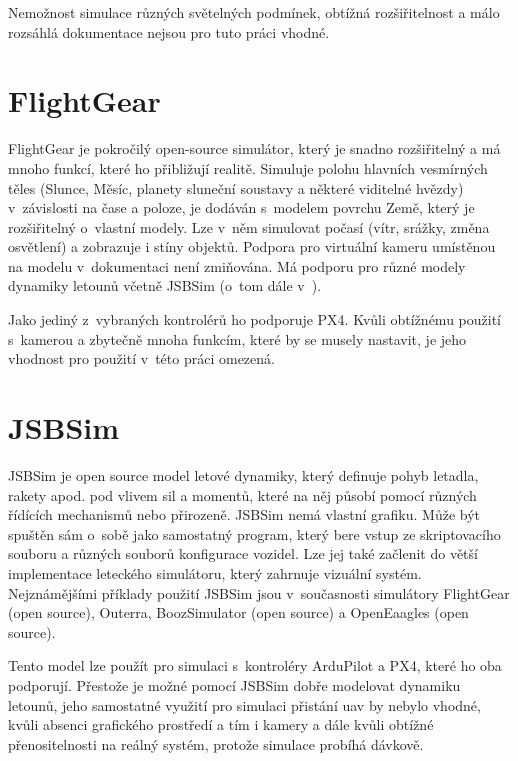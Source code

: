         Nemožnost simulace různých světelných podmínek, obtížná rozšiřitelnost a málo rozsáhlá dokumentace nejsou pro tuto práci vhodné.

    \section{FlightGear} \label{sec:flightgear}
        FlightGear je pokročilý open-source simulátor, který je snadno rozšiřitelný a má mnoho funkcí, které ho přibližují realitě. Simuluje polohu hlavních vesmírných těles (Slunce, Měsíc, planety sluneční soustavy a některé viditelné hvězdy) v~závislosti na čase a poloze, je dodáván s~modelem povrchu Země, který je rozšiřitelný o~vlastní modely. Lze v~něm simulovat počasí (vítr, srážky, změna osvětlení) a zobrazuje i stíny objektů. Podpora pro virtuální kameru umístěnou na modelu v~dokumentaci není zmiňována. Má podporu pro různé modely dynamiky letounů včetně JSBSim (o~tom dále v~). \cite{flightgear}

        Jako jediný z~vybraných kontrolérů ho podporuje PX4. Kvůli obtížnému použití s~kamerou a zbytečně mnoha funkcím, které by se musely nastavit, je jeho vhodnost pro použití v~této práci omezená.

    \section{JSBSim} \label{sec:jsbsim}
        JSBSim je open source model letové dynamiky, který definuje pohyb letadla, rakety apod. pod vlivem sil a momentů, které na něj působí pomocí různých řídících mechanismů nebo přirozeně. JSBSim nemá vlastní grafiku. Může být spuštěn sám o~sobě jako samostatný program, který bere vstup ze skriptovacího souboru a různých souborů konfigurace vozidel. Lze jej také začlenit do větší implementace leteckého simulátoru, který zahrnuje vizuální systém. Nejznámějšími příklady použití JSBSim jsou v~současnosti simulátory FlightGear (open source), Outerra, BoozSimulator (open source) a OpenEaagles (open source). \cite{jsbsim}

        Tento model lze použít pro simulaci s~kontroléry ArduPilot a PX4, které ho oba podporují. Přestože je možné pomocí JSBSim dobře modelovat dynamiku letounů, jeho samostatné využití pro simulaci přistání \acrshort{uav} by nebylo vhodné, kvůli absenci grafického prostředí a tím i kamery a dále kvůli obtížné přenositelnosti na reálný systém, protože simulace probíhá dávkově.

